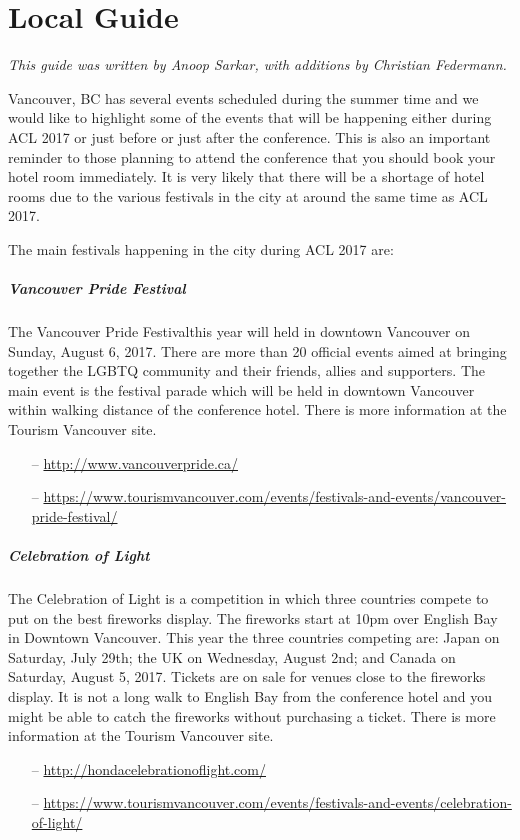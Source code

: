 \chapter{Local Guide}

\emph{This guide was written by Anoop Sarkar, with additions by Christian Federmann.}

Vancouver, BC has several events scheduled during the summer time and we would like to highlight some of the events that will be happening either during ACL 2017 or just before or just after the conference. This is also an important reminder to those planning to attend the conference that you should book your hotel room immediately. It is very likely that there will be a shortage of hotel rooms due to the various festivals in the city at around the same time as ACL 2017.

The main festivals happening in the city during ACL 2017 are:

\paragraph{Vancouver Pride Festival}
The Vancouver Pride Festivalthis year will held in downtown Vancouver on Sunday, August 6, 2017. There are more than 20 official events aimed at bringing together the LGBTQ community and their friends, allies and supporters. The main event is the festival parade which will be held in downtown Vancouver within walking distance of the conference hotel. There is more information at the Tourism Vancouver site.
%
\begin{itemize}
\item[--]\url{http://www.vancouverpride.ca/}
\item[--]\url{https://www.tourismvancouver.com/events/festivals-and-events/vancouver-pride-festival/}
\end{itemize}

\paragraph{Celebration of Light}
The Celebration of Light is a competition in which three countries compete to put on the best fireworks display. The fireworks start at 10pm over English Bay in Downtown Vancouver. This year the three countries competing are: Japan on Saturday, July 29th; the UK on Wednesday, August 2nd; and Canada on Saturday, August 5, 2017. Tickets are on sale for venues close to the fireworks display. It is not a long walk to English Bay from the conference hotel and you might be able to catch the fireworks without purchasing a ticket. There is more information at the Tourism Vancouver site.
%
\begin{itemize}
\item[--]\url{http://hondacelebrationoflight.com/}
\item[--]\url{https://www.tourismvancouver.com/events/festivals-and-events/celebration-of-light/}
\end{itemize}

